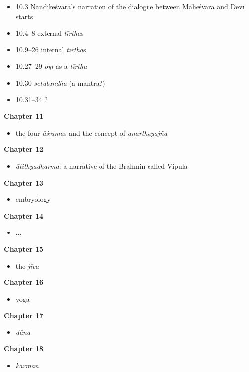\documentclass[11pt]{book} %
\newcommand{\skt}[1]{\textit{#1}}
\begin{document}
\begin{itemize}


\item 10.3 Nandikeśvara's narration of the dialogue 
   between Maheśvara and Devī starts
\item 10.4--8 external \skt{tīrtha}s 
\item 10.9--26 internal \skt{tīrtha}s
\item 10.27--29 \skt{oṃ} as a \skt{tīrtha}
\item 10.30 \skt{setubandha} (a mantra?)
\item 10.31--34 ?
\end{itemize}

\pagebreak

 \textbf{Chapter 11}
\begin{itemize}
\item the four \skt{āśrama}s and the concept of \skt{anarthayajña}
\end{itemize}

 \textbf{Chapter 12}
\begin{itemize}
\item \skt{ātithyadharma}: a narrative of the Brahmin called Vipula
\end{itemize}

 \textbf{Chapter 13}
\begin{itemize}
\item embryology
\end{itemize}

 \textbf{Chapter 14}
\begin{itemize}
\item ...
\end{itemize}

 \textbf{Chapter 15}
\begin{itemize}
\item the \skt{jīva}
\end{itemize}

\textbf{Chapter 16}
\begin{itemize}
\item yoga
\end{itemize}

\textbf{Chapter 17}
\begin{itemize}
\item \skt{dāna}
\end{itemize}

\textbf{Chapter 18}
\begin{itemize}
\item \skt{karman}
\end{itemize}
\end{document}
